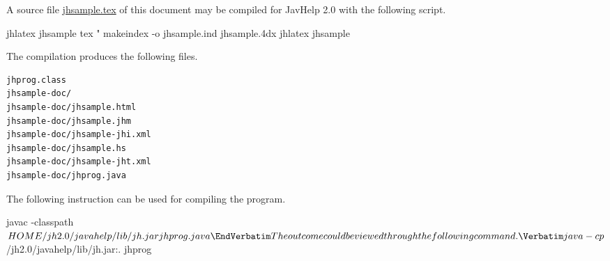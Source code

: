 ﻿\documentclass{article}
\begin{document}
A source file \edef\temp{\noexpand\url{jhsample.tex}}\temp{} of this
document  may be compiled for JavHelp 2.0 with the following script.

\Verbatim
jhlatex jhsample
tex "\def\filename{{$1}{idx}{4dx}{ind}} 
makeindex -o jhsample.ind jhsample.4dx
jhlatex jhsample
\EndVerbatim

The compilation produces the following files.

\begin{verbatim}
jhprog.class
jhsample-doc/
jhsample-doc/jhsample.html
jhsample-doc/jhsample.jhm
jhsample-doc/jhsample-jhi.xml
jhsample-doc/jhsample.hs
jhsample-doc/jhsample-jht.xml
jhsample-doc/jhprog.java
\end{verbatim}


The following instruction can be used for compiling the program.

\Verbatim
javac -classpath ${HOME}/jh2.0/javahelp/lib/jh.jar jhprog.java
\EndVerbatim


The outcome could be viewed through the following command.

\Verbatim
java -cp ${\home}/jh2.0/javahelp/lib/jh.jar:. jhprog
\EndVerbatim


\printindex
\end{document}

